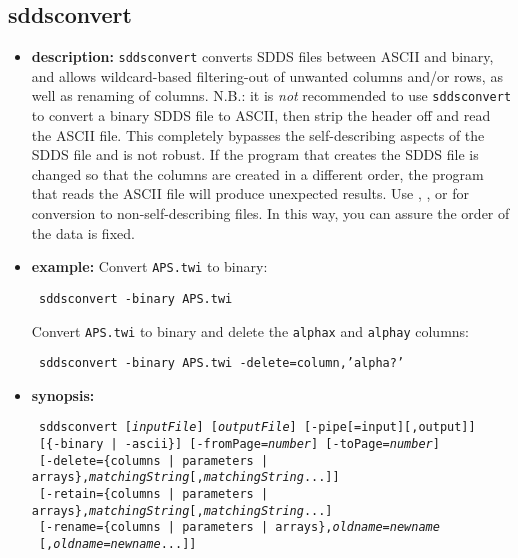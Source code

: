 \newpage
\subsection{sddsconvert}
\label{sddsconvert}

\begin{itemize}
\item {\bf description:} \verb|sddsconvert| converts SDDS files between ASCII and binary, and allows wildcard-based 
filtering-out of unwanted columns and/or rows, as well as renaming of columns.
N.B.: it is {\em not} recommended to use \verb|sddsconvert| to
convert a binary SDDS file to ASCII, then strip the header off and read the ASCII file.  This completely
bypasses the self-describing aspects of the SDDS file and is not robust.  If the program that creates the
SDDS file is changed so that the columns are created in a different order, the program that reads the ASCII file
will produce unexpected results. Use , , or 
for conversion to non-self-describing files.  In this way, you can assure the order of the data is fixed.
\item {\bf example:}
Convert {\tt APS.twi} to binary:
\begin{flushleft}{\tt
sddsconvert -binary APS.twi
}\end{flushleft}
Convert {\tt APS.twi} to binary and delete the {\tt alphax} and {\tt alphay} columns:
\begin{flushleft}{\tt
sddsconvert -binary APS.twi -delete=column,'alpha?'
}\end{flushleft}
\item {\bf synopsis:} 
\begin{flushleft}{\tt
sddsconvert [{\em inputFile}] [{\em outputFile}] [-pipe[=input][,output]] \\ \ 
[\{-binary | -ascii\}] [-fromPage={\em number}] [-toPage={\em number}]  \\ \ 
[-delete=\{columns | parameters | arrays\},{\em matchingString}[,{\em matchingString}...]] \\ \ 
[-retain=\{columns | parameters | arrays\},{\em matchingString}[,{\em matchingString}...] \\ \ 
[-rename=\{columns | parameters | arrays\},{\em oldname}={\em newname} \\ \ 
\hspace*{10mm}[,{\em oldname}={\em newname}...]] \\ \ 
}
\end{flushleft}
\end{itemize}

